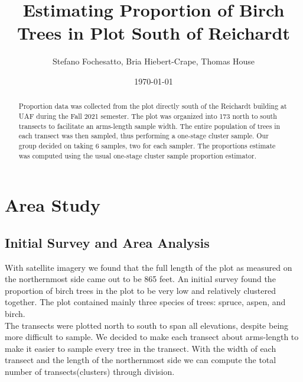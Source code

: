 \documentclass[12pt]{amsart}
\title{Estimating Proportion of Birch Trees in Plot South of Reichardt}
\author{Stefano Fochesatto, Bria Hiebert-Crape, Thomas House}
\date{\today} %
\begin{document}
\begin{abstract}
    Proportion data was collected from the plot directly south of the Reichardt building at UAF during the Fall 2021 semester. 
    The plot was organized into 173 north to south transects to facilitate an arms-length sample width. The entire population of trees 
    in each transect was then sampled, thus performing a one-stage cluster sample. Our group decided on taking 6 samples, two for each sampler. 
    The proportions estimate was computed using the usual one-stage cluster sample proportion estimator. 
\end{abstract}

\doublespacing %


\maketitle

\section*{Area Study}%
\subsection*{Initial Survey and Area Analysis}
With satellite imagery we found that the full length of the plot as measured on the northernmost side came out to be 865 feet. An initial survey found the proportion of birch trees in the 
plot to be very low and relatively clustered together. The plot contained mainly three species of trees: spruce, aspen, and birch. \\
The transects were plotted north to south to span all elevations, despite being more difficult to sample. We decided to make each 
transect about arms-length to make it easier to sample every tree in the transect. With the width of each transect and the length of the northernmost 
side we can compute the total number of transects(clusters) through division. 
\end{document}
